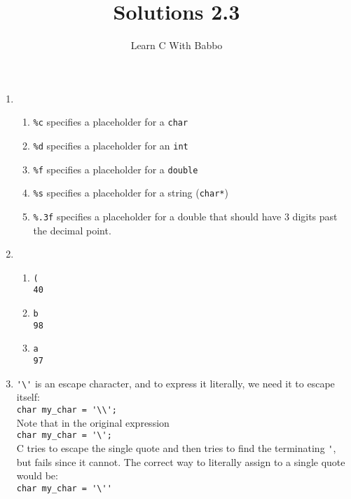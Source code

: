 \documentclass{article}
\begin{document}
\title{Solutions 2.3}
\author{Learn C With Babbo}
\date{}
\maketitle
\begin{enumerate}
\item
\begin{enumerate}
\item \verb|%c| specifies a placeholder for a \verb|char|
\item \verb|%d| specifies a placeholder for an \verb|int|
\item \verb|%f| specifies a placeholder for a \verb|double|
\item \verb|%s| specifies a placeholder for a string (\verb|char*|)
\item \verb|%.3f| specifies a placeholder for a double that should have 3 digits past the decimal point.
\end{enumerate}

\item
\begin{enumerate}
\item \begin{lstlisting}[style=CStyle]
(
40
\end{lstlisting}

\item \begin{lstlisting}[style=CStyle]
b
98
\end{lstlisting}

\item \begin{lstlisting}[style=CStyle]
a
97
\end{lstlisting}
\end{enumerate}

\item \verb|'\'| is an escape character, and to express it literally, we need it to escape itself: \\
\verb|char my_char = '\\';| \\
Note that in the original expression \\
\verb|char my_char = '\';| \\
C tries to escape the single quote and then tries to find the terminating \verb|'|, but fails since it cannot. The 
correct way to literally assign to a single quote would be: \\
\verb|char my_char = '\''| \\


\end{enumerate}
\end{document}
